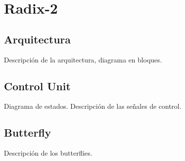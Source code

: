 \section{Radix-2}
\subsection{Arquitectura} 
Descripción de la arquitectura, diagrama en bloques.
\subsection{Control Unit}
Diagrama de estados. Descripción de las señales de control.
\subsection{Butterfly}
Descripción de los butterflies. 
